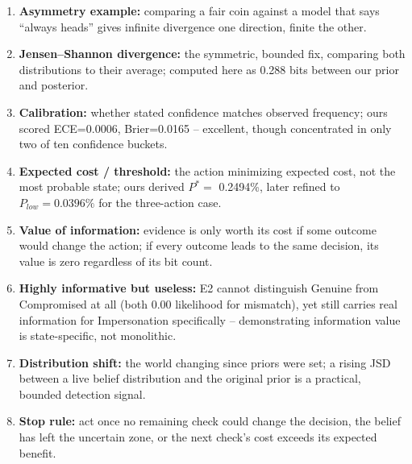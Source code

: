 \documentclass[10pt]{article}
\begin{document}
{\begin{enumerate}
other considers possible.
\item \textbf{Asymmetry example:} comparing a fair coin against a
model that says ``always heads'' gives infinite divergence one
direction, finite the other.
\item \textbf{Jensen--Shannon divergence:} the symmetric, bounded fix,
comparing both distributions to their average; computed here as 0.288
bits between our prior and posterior.
\item \textbf{Calibration:} whether stated confidence matches observed
frequency; ours scored ECE=0.0006, Brier=0.0165 -- excellent, though
concentrated in only two of ten confidence buckets.
\item \textbf{Expected cost / threshold:} the action minimizing
expected cost, not the most probable state; ours derived $P^*=$
0.2494\%, later refined to $P_{low}=0.0396\%$ for the three-action
case.
\item \textbf{Value of information:} evidence is only worth its cost
if some outcome would change the action; if every outcome leads to the
same decision, its value is zero regardless of its bit count.
\item \textbf{Highly informative but useless:} E2 cannot distinguish
Genuine from Compromised at all (both 0.00 likelihood for mismatch),
yet still carries real information for Impersonation specifically --
demonstrating information value is state-specific, not monolithic.
\item \textbf{Distribution shift:} the world changing since priors
were set; a rising JSD between a live belief distribution and the
original prior is a practical, bounded detection signal.
\item \textbf{Stop rule:} act once no remaining check could change the
decision, the belief has left the uncertain zone, or the next check's
cost exceeds its expected benefit.
\end{enumerate}
}
\end{document}
